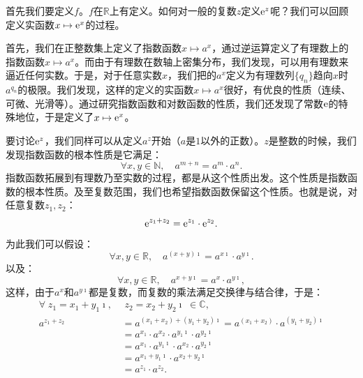 \documentclass[12pt,UTF8,fontset=none]{ctexbook}
\begin{document}
\begin{so}
    首先我们要定义$f$。$f$在$\mathbb{R}$上有定义。如何对一般的复数$z$定义$\mathrm{e}^z$呢？我们可以回顾定义实函数$x\mapsto \mathrm{e}^x$的过程。
    
    首先，我们在正整数集上定义了指数函数$x\mapsto a^x$，通过逆运算定义了有理数上的指数函数$x\mapsto a^x$。而由于有理数在数轴上密集分布，我们发现，可以用有理数来逼近任何实数。于是，对于任意实数$x$，我们把的$a^x$定义为有理数列$\{q_n\}$趋向$x$时$a^{q_n}$的极限。我们发现，这样的定义的实函数$x\mapsto a^x$很好，有优良的性质（连续、可微、光滑等）。通过研究指数函数和对数函数的性质，我们还发现了常数$\mathrm{e}$的特殊地位，于是定义了$x\mapsto \mathrm{e}^x$。

    要讨论$\mathrm{e}^z$，我们同样可以从定义$a^z$开始（$a$是$1$以外的正数）。$z$是整数的时候，我们发现指数函数的根本性质是它满足：
    \begin{equation}
        \forall x, y \in \mathbb{N}, \quad a^{m + n} = a^m \cdot a^n. \label{4-6-0} 
    \end{equation}
    指数函数拓展到有理数乃至实数的过程，都是从这个性质出发。这个性质是指数函数的根本性质。及至复数范围，我们也希望指数函数保留这个性质。也就是说，对任意复数$z_1, z_2$：
    \begin{equation}
        \mathrm{e}^{z_1 + z_2} = \mathrm{e}^{z_1} \cdot \mathrm{e}^{z_2}. \label{4-6-1}
    \end{equation}
    为此我们可以假设：
    \begin{equation}
        \forall x, y \in \mathbb{R}, \quad a^{(x + y)\imath} = a^{x\imath} \cdot a^{y\imath}. \label{4-6-3}
    \end{equation}
    以及：
    \begin{equation}
        \forall x, y \in \mathbb{R}, \quad a^{x+y\imath} = a^x \cdot a^{y\imath},  \label{4-6-2}
    \end{equation}
    这样，由于$a^x$和$a^{y\imath}$都是复数，而复数的乘法满足交换律与结合律，于是：
    \begin{align*}
        \forall \; z_1 = x_1 + y_1\imath, \,&\; z_2 = x_2 + y_2\imath \; \in \mathbb{C}, \\
        a^{z_1 + z_2} &= a^{(x_1 + x_2) + (y_1 + y_2)\imath} = a^{(x_1 + x_2)} \cdot a^{(y_1 + y_2)\imath} \\
        &= a^{x_1} \cdot a^{x_2} \cdot a^{y_1\imath} \cdot a^{y_2\imath} \\
        &= a^{x_1} \cdot a^{y_1\imath} \cdot a^{x_2} \cdot a^{y_2\imath} \\
        &= a^{x_1 + y_1\imath} \cdot a^{x_2 + y_2\imath} \\
        &= a^{z_1} \cdot a^{z_2}.
    \end{align*}


\end{so}
\end{document}
